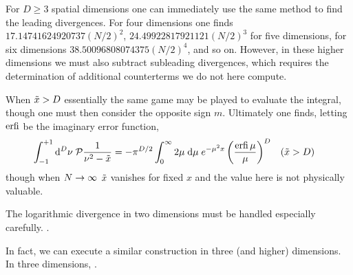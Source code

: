 For $D\geq3$ spatial dimensions one can immediately use the same method to find the leading divergences.
For four dimensions one finds $17.14741624920737 (N/2)^2$, $24.49922817921121 (N/2)^3$ for five dimensions, for six dimensions $38.50096808074375 (N/2)^4$, and so on.  However, in these higher dimensions we must also subtract subleading divergences, which requires the determination of additional counterterms we do not here compute.

When $\tilde{x} > D$ essentially the same game may be played to evaluate the integral, though one must then consider the opposite sign $m$.  Ultimately one finds, letting $\operatorname{erfi}$ be the imaginary error function,
\begin{align}
    \int_{-1}^{+1} \mathrm{d}^D\nu\; \mathcal{P} \frac{1}{\nu^2-\tilde{x}} &= -\pi^{D/2} \int_0^{\infty} 2\mu\; \mathrm{d}\mu\; e^{-\mu^2 x} \left(\frac{\operatorname{erfi} \mu}{\mu}\right)^D
    &
    (\tilde{x}&>D)
\end{align}
though when $N\rightarrow\infty$ $\tilde{x}$ vanishes for fixed $x$ and the value here is not physically valuable.  

The logarithmic divergence in two dimensions must be handled especially carefully.
.

In fact, we can execute a similar construction in three (and higher) dimensions.  In three dimensions, .
